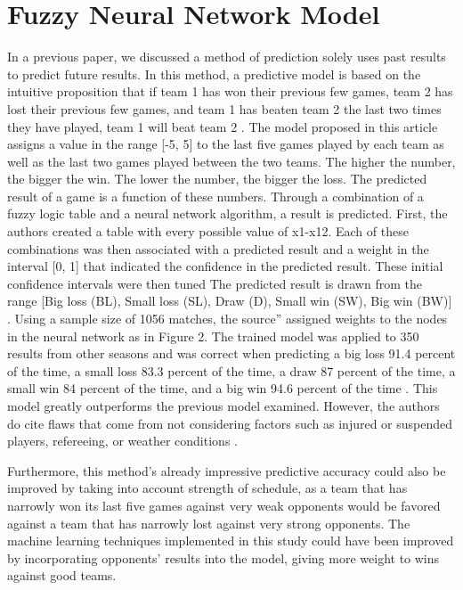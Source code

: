 \documentclass{article}
\begin{document}
\section{Fuzzy Neural Network Model}
In a previous paper, we discussed a method of prediction solely uses past results to predict future results. In this method, a predictive model is based on the intuitive proposition that if team 1 has won their previous few games, team 2 has lost their previous few games, and team 1 has beaten team 2 the last two times they have played, team 1 will beat team 2 \cite{FuzzyModel}. The model proposed in this article assigns a value in the range [-5, 5] to the last five games played by each team as well as the last two games played between the two teams. The higher the number, the bigger the win. The lower the number, the bigger the loss. The predicted result of a game is a function of these numbers. Through a combination of a fuzzy logic table and a neural network algorithm, a result is predicted. First, the authors created a table with every possible value of x1-x12. Each of these combinations was then associated with a predicted result and a weight in the interval [0, 1] that indicated the confidence in the predicted result. These initial confidence intervals were then tuned  The predicted result is drawn from the range [Big loss (BL), Small loss (SL), Draw (D), Small win (SW), Big win (BW)] \cite{FuzzyModel}. Using a sample size of 1056 matches, the source'' assigned weights to the nodes in the neural network as in Figure 2. The trained model was applied to 350 results from other seasons and was correct when predicting a big loss 91.4 percent of the time, a small loss 83.3 percent of the time, a draw 87 percent of the time, a small win 84 percent of the time, and a big win 94.6 percent of the time \cite{FuzzyModel}. This model greatly outperforms the previous model examined. However, the authors do cite flaws that come from not considering factors such as injured or suspended players, refereeing, or weather conditions \cite{FuzzyModel}.

Furthermore, this method's already impressive predictive accuracy could also be improved by taking into account strength of schedule, as a team that has narrowly won its last five games against very weak opponents would be favored against a team that has narrowly lost against very strong opponents. The machine learning techniques implemented in this study could have been improved by incorporating opponents' results into the model, giving more weight to wins against good teams.
\end{document}
